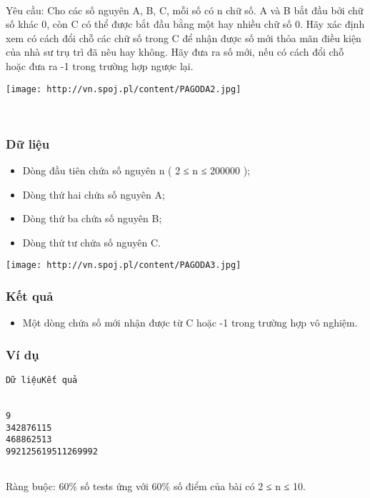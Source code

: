  

Yêu cầu: Cho các số nguyên A, B, C, mỗi số có n chữ số. A và B bắt đầu bởi chữ số khác 0, còn C có thể được bắt đầu bằng một hay nhiều chữ số 0. Hãy xác định xem có cách đổi chỗ các chữ số trong C để nhận được số mới thỏa mãn điều kiện của nhà sư trụ trì đã nêu hay không. Hãy đưa ra số mới, nếu có cách đổi chỗ hoặc đưa ra -1 trong trường hợp ngược lại.


\texttt{[image: http://vn.spoj.pl/content/PAGODA2.jpg]}

 

\subsubsection{Dữ liệu}
\begin{itemize}
	\item Dòng đầu tiên chứa số nguyên n ( 2 ≤ n ≤ 200000 );
	\item Dòng thứ hai chứa số nguyên A;
	\item Dòng thứ ba chứa số nguyên B;
	\item Dòng thứ tư chứa số nguyên C.
\end{itemize}


\texttt{[image: http://vn.spoj.pl/content/PAGODA3.jpg]}

\subsubsection{Kết quả}
\begin{itemize}
	\item Một dòng chứa số mới nhận được từ C hoặc -1 trong trường hợp vô nghiệm.
\end{itemize}

\subsubsection{Ví dụ}
\begin{verbatim}
Dữ liệuKết quả


9
342876115
468862513
992125619511269992


\end{verbatim}

Ràng buộc: 60\% số tests ứng với 60\% số điểm của bài có 2 ≤ n ≤ 10.